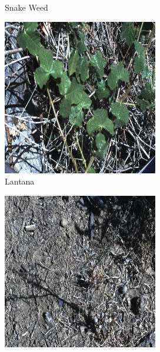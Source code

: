\begin{figure}[!h]
\begin{subfigure}{0.24\textwidth}
        \caption{Snake Weed}
    \end{subfigure}
    \hfill
    \begin{subfigure}{0.24\textwidth}
        \includegraphics[width=\textwidth]{figuras/problema/lantana.jpg}
        \caption{Lantana}
    \end{subfigure}
    \hfill
    \begin{subfigure}{0.24\textwidth}
        \includegraphics[width=\textwidth]{figuras/problema/prickly_acacia.jpg}

\end{subfigure}
\end{figure}
